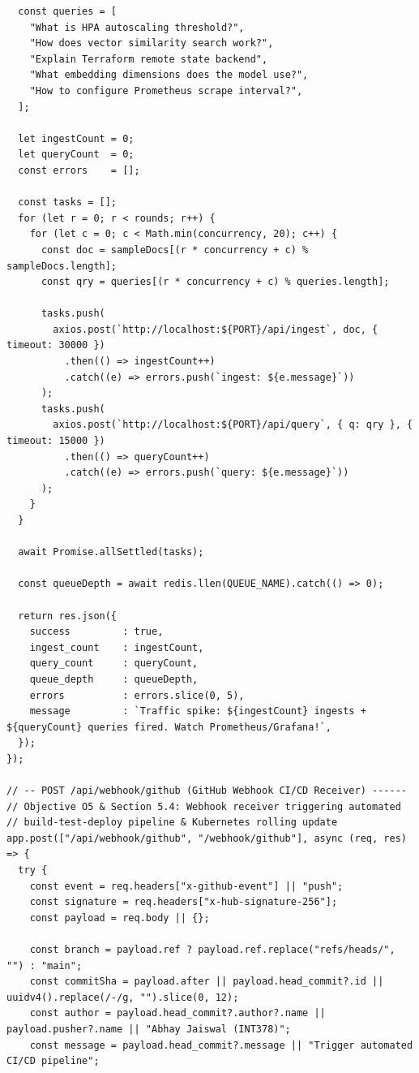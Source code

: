 \documentclass[12pt,a4paper]{report}
\begin{document}
\begin{lstlisting}
  const queries = [
    "What is HPA autoscaling threshold?",
    "How does vector similarity search work?",
    "Explain Terraform remote state backend",
    "What embedding dimensions does the model use?",
    "How to configure Prometheus scrape interval?",
  ];

  let ingestCount = 0;
  let queryCount  = 0;
  const errors    = [];

  const tasks = [];
  for (let r = 0; r < rounds; r++) {
    for (let c = 0; c < Math.min(concurrency, 20); c++) {
      const doc = sampleDocs[(r * concurrency + c) % sampleDocs.length];
      const qry = queries[(r * concurrency + c) % queries.length];

      tasks.push(
        axios.post(`http://localhost:${PORT}/api/ingest`, doc, { timeout: 30000 })
          .then(() => ingestCount++)
          .catch((e) => errors.push(`ingest: ${e.message}`))
      );
      tasks.push(
        axios.post(`http://localhost:${PORT}/api/query`, { q: qry }, { timeout: 15000 })
          .then(() => queryCount++)
          .catch((e) => errors.push(`query: ${e.message}`))
      );
    }
  }

  await Promise.allSettled(tasks);

  const queueDepth = await redis.llen(QUEUE_NAME).catch(() => 0);

  return res.json({
    success         : true,
    ingest_count    : ingestCount,
    query_count     : queryCount,
    queue_depth     : queueDepth,
    errors          : errors.slice(0, 5),
    message         : `Traffic spike: ${ingestCount} ingests + ${queryCount} queries fired. Watch Prometheus/Grafana!`,
  });
});

// -- POST /api/webhook/github (GitHub Webhook CI/CD Receiver) ------
// Objective O5 & Section 5.4: Webhook receiver triggering automated
// build-test-deploy pipeline & Kubernetes rolling update
app.post(["/api/webhook/github", "/webhook/github"], async (req, res) => {
  try {
    const event = req.headers["x-github-event"] || "push";
    const signature = req.headers["x-hub-signature-256"];
    const payload = req.body || {};

    const branch = payload.ref ? payload.ref.replace("refs/heads/", "") : "main";
    const commitSha = payload.after || payload.head_commit?.id || uuidv4().replace(/-/g, "").slice(0, 12);
    const author = payload.head_commit?.author?.name || payload.pusher?.name || "Abhay Jaiswal (INT378)";
    const message = payload.head_commit?.message || "Trigger automated CI/CD pipeline";


\end{lstlisting}
\end{document}
